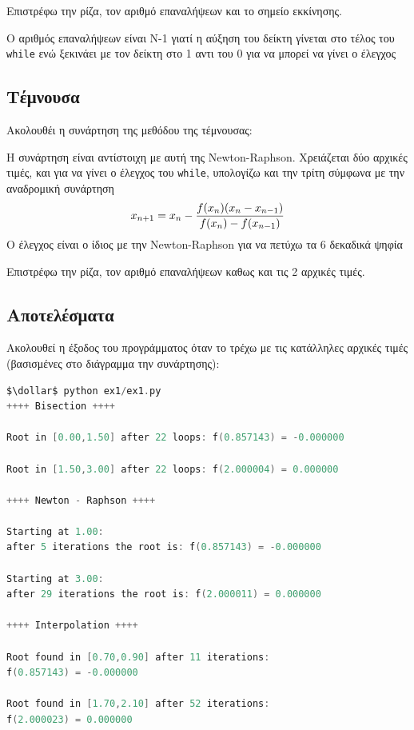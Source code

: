 Επιστρέφω την ρίζα, τον αριθμό επαναλήψεων και το σημείο εκκίνησης.
\textcolor{mygray}{
\begin{footnotesize}
  Ο αριθμός επαναλήψεων είναι Ν-1 γιατί η αύξηση του δείκτη γίνεται
  στο τέλος του \texttt{while} ενώ ξεκινάει με τον δείκτη στο 1 αντι του 0
  για να μπορεί να γίνει ο έλεγχος
\end{footnotesize}}

\subsection{Τέμνουσα}
Ακολουθέι η συνάρτηση της μεθόδου της τέμνουσας:


Η συνάρτηση είναι αντίστοιχη με αυτή της Newton-Raphson.
Χρειάζεται δύο αρχικές τιμές, και για να γίνει ο έλεγχος του \texttt{while},
υπολογίζω και την τρίτη σύμφωνα με την αναδρομική συνάρτηση
$$x_{n+1} = x_n - {{f(x_n)(x_n - x_{n-1})} \over {f(x_n) - f(x_{n-1})}}$$
Ο έλεγχος είναι ο ίδιος με την Newton-Raphson για να πετύχω τα
6 δεκαδικά ψηφία

Επιστρέφω την ρίζα, τον αριθμό επαναλήψεων καθως και τις 2 αρχικές τιμές.

\subsection{Αποτελέσματα}
Ακολουθεί η έξοδος του προγράμματος όταν το τρέχω με τις
κατάλληλες αρχικές τιμές (βασισμένες στο διάγραμμα την συνάρτησης):

\begin{lstlisting}[language=C, mathescape=true]
$\dollar$ python ex1/ex1.py
++++ Bisection ++++

Root in [0.00,1.50] after 22 loops: f(0.857143) = -0.000000

Root in [1.50,3.00] after 22 loops: f(2.000004) = 0.000000

++++ Newton - Raphson ++++

Starting at 1.00:
after 5 iterations the root is: f(0.857143) = -0.000000

Starting at 3.00:
after 29 iterations the root is: f(2.000011) = 0.000000

++++ Interpolation ++++

Root found in [0.70,0.90] after 11 iterations:
f(0.857143) = -0.000000

Root found in [1.70,2.10] after 52 iterations:
f(2.000023) = 0.000000
\end{lstlisting}

